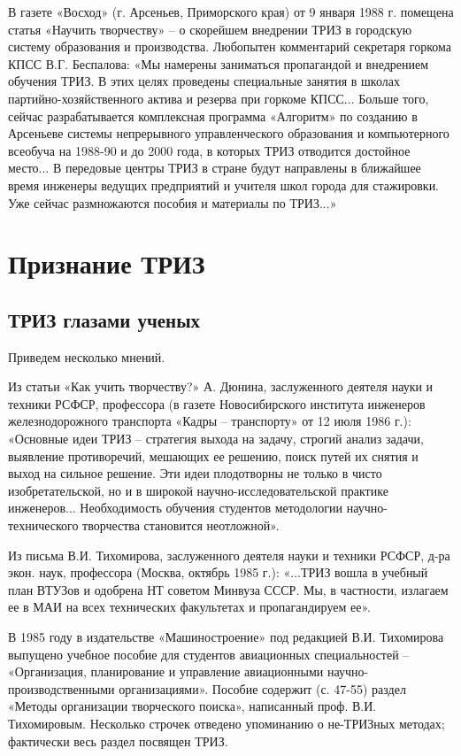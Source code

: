\documentclass[11pt,a4paper]{article}
\begin{document}
В газете «Восход» (г. Арсеньев, Приморского края) от 9 января 1988 г. помещена
статья «Научить творчеству» -- о скорейшем внедрении ТРИЗ в городскую систему
образования и производства. Любопытен комментарий секретаря горкома КПСС
В.Г. Беспалова: «Мы намерены заниматься пропагандой и внедрением обучения
ТРИЗ. В этих целях проведены специальные занятия в школах
партийно-хозяйственного актива и резерва при горкоме КПСС... Больше того,
сейчас разрабатывается комплексная программа «Алгоритм» по созданию в
Арсеньеве системы непрерывного управленческого образования и компьютерного
всеобуча на 1988-90 и до 2000 года, в которых ТРИЗ отводится достойное
место... В передовые центры ТРИЗ в стране будут направлены в ближайшее время
инженеры ведущих предприятий и учителя школ города для стажировки. Уже сейчас
размножаются пособия и материалы по ТРИЗ...»

\section{Признание ТРИЗ}

\subsection{ТРИЗ глазами ученых}

Приведем несколько мнений.

Из статьи «Как учить творчеству?» А. Дюнина, заслуженного деятеля науки и
техники РСФСР, профессора (в газете Новосибирского института инженеров
железнодорожного транспорта «Кадры -- транспорту» от 12 июля 1986 г.):
«Основные идеи ТРИЗ -- стратегия выхода на задачу, строгий анализ задачи,
выявление противоречий, мешающих ее решению, поиск путей их снятия и выход на
сильное решение. Эти идеи плодотворны не только в чисто изобретательской, но и
в широкой научно-исследовательской практике инженеров... Необходимость
обучения студентов методологии научно-технического творчества становится
неотложной».

Из письма В.И. Тихомирова, заслуженного деятеля науки и техники РСФСР, д-ра
экон. наук, профессора (Москва, октябрь 1985 г.): «...ТРИЗ вошла в учебный
план ВТУЗов и одобрена НТ советом Минвуза СССР. Мы, в частности, излагаем ее в
МАИ на всех технических факультетах и пропагандируем ее».

В 1985 году в издательстве «Машиностроение» под редакцией В.И. Тихомирова
выпущено учебное пособие для студентов авиационных специальностей --
«Организация, планирование и управление авиационными научно-производственными
организациями». Пособие содержит (с. 47-55) раздел «Методы организации
творческого поиска», написанный проф. В.И. Тихомировым. Несколько строчек
отведено упоминанию о не-ТРИЗных методах; фактически весь раздел посвящен
ТРИЗ.
\end{document}
